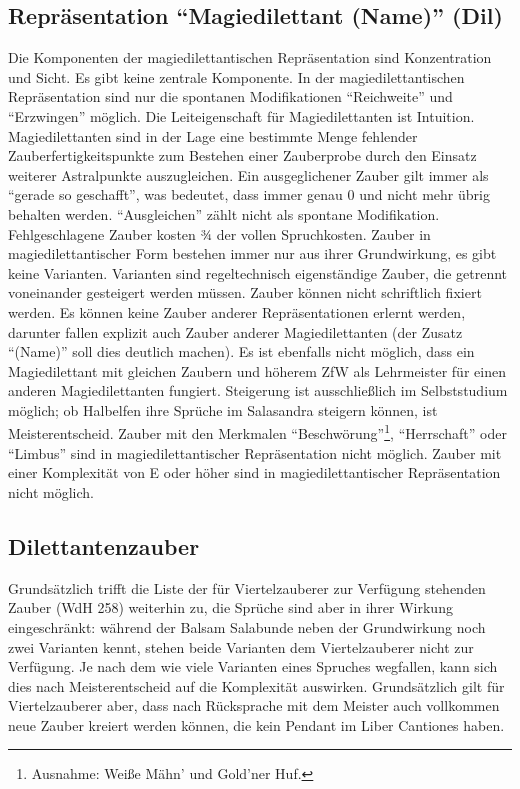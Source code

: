 \subsection{Repräsentation \enquote{Magiedilettant (Name)} (Dil)}
Die Komponenten der magiedilettantischen Repräsentation sind Konzentration und Sicht. Es gibt keine zentrale Komponente. In der magiedilettantischen Repräsentation sind nur die spontanen Modifikationen \enquote{Reichweite} und \enquote{Erzwingen} möglich. Die Leiteigenschaft für Magiedilettanten ist Intuition. Magiedilettanten sind in der Lage eine bestimmte Menge fehlender Zauberfertigkeitspunkte zum Bestehen einer Zauberprobe durch den Einsatz weiterer Astralpunkte auszugleichen. Ein ausgeglichener Zauber gilt immer als \enquote{gerade so geschafft}, was bedeutet, dass immer genau \SI{0}{\ZfPstern} und nicht mehr übrig behalten werden. \enquote{Ausgleichen} zählt nicht als spontane Modifikation. Fehlgeschlagene Zauber kosten ¾ der vollen Spruchkosten. Zauber in magiedilettantischer Form bestehen immer nur aus ihrer Grundwirkung, es gibt keine Varianten. Varianten sind regeltechnisch eigenständige Zauber, die getrennt voneinander gesteigert werden müssen. Zauber können nicht schriftlich fixiert werden. Es können keine Zauber anderer Repräsentationen erlernt werden, darunter fallen explizit auch Zauber anderer Magiedilettanten (der Zusatz \enquote{(Name)} soll dies deutlich machen). Es ist ebenfalls nicht möglich, dass ein Magiedilettant mit gleichen Zaubern und höherem ZfW als Lehrmeister für einen anderen Magiedilettanten fungiert. Steigerung ist ausschließlich im Selbststudium möglich; ob Halbelfen ihre Sprüche im Salasandra steigern können, ist Meisterentscheid. Zauber mit den Merkmalen \enquote{Beschwörung}\footnote{Ausnahme: Weiße Mähn' und Gold'ner Huf.}, \enquote{Herrschaft} oder \enquote{Limbus} sind in magiedilettantischer Repräsentation nicht möglich. Zauber mit einer Komplexität von E oder höher sind in magiedilettantischer Repräsentation nicht möglich.

\subsection{Dilettantenzauber}
Grundsätzlich trifft die Liste der für Viertelzauberer zur Verfügung stehenden Zauber (WdH 258) weiterhin zu, die Sprüche sind aber in ihrer Wirkung eingeschränkt: während der Balsam Salabunde neben der Grundwirkung noch zwei Varianten kennt, stehen beide Varianten dem Viertelzauberer nicht zur Verfügung. Je nach dem wie viele Varianten eines Spruches wegfallen, kann sich dies nach Meisterentscheid auf die Komplexität auswirken. Grundsätzlich gilt für Viertelzauberer aber, dass nach Rücksprache mit dem Meister auch vollkommen neue Zauber kreiert werden können, die kein Pendant im Liber Cantiones haben.


